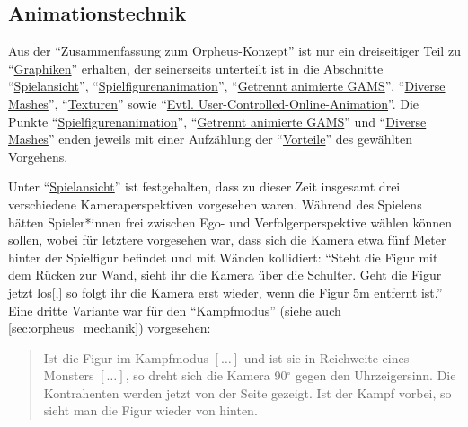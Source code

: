 \documentclass[a5paper,pagesize]{scrbook}
\begin{document}
\subsection{Animationstechnik}\label{sec:orpheus_technik_animationstechnik}
Aus der \enquote{Zusammenfassung zum Orpheus-Konzept} ist nur ein dreiseitiger Teil zu \enquote{\uline{Gra\-phi\-ken}} erhalten, der seinerseits unterteilt ist in die Abschnitte \enquote{\uline{Spiel\-an\-sicht}}, \enquote{\uline{Spiel\-fi\-gu\-ren\-ani\-ma\-ti\-on}}, \enquote{\uline{Ge\-trennt ani\-mier\-te GAMS}}, \enquote{\uline{Di\-ver\-se Mashes}}, \enquote{\uline{Tex\-tu\-ren}} sowie \enquote{\uline{Evtl. User-Con\-trol\-led-On\-line-Ani\-ma\-ti\-on}}.
Die Punkte \enquote{\uline{Spiel\-fi\-gu\-ren\-ani\-ma\-ti\-on}}, \enquote{\uline{Ge\-trennt ani\-mier\-te GAMS}} und \enquote{\uline{Di\-ver\-se Mashes}} enden jeweils mit einer Aufzählung der \enquote{\uline{Vor\-tei\-le}} des gewählten Vorgehens.

Unter \enquote{\uline{Spielansicht}} ist festgehalten, dass zu dieser Zeit insgesamt drei verschiedene Kameraperspektiven vorgesehen waren.
Während des Spielens hätten Spieler*innen frei zwischen Ego- und Verfolgerperspektive wählen können sollen, wobei für letztere vorgesehen war, dass sich die Kamera etwa fünf Meter hinter der Spielfigur befindet und mit Wänden kollidiert:
\enquote{Steht die Figur mit dem Rücken zur Wand, sieht ihr die Kamera über die Schulter. Geht die Figur jetzt los[,] so folgt ihr die Kamera erst wieder, wenn die Figur 5m entfernt ist.}
Eine dritte Variante war für den \enquote{Kampfmodus} (siehe auch \autoref{sec:orpheus_mechanik}) vorgesehen:

\begin{quote}
Ist die Figur im Kampfmodus $[\dots]$ und ist sie in Reichweite eines Monsters $[\dots]$, so dreht sich die Kamera 90$^\circ$ gegen den Uhrzeigersinn. Die Kontrahenten werden jetzt von der Seite gezeigt. Ist der Kampf vorbei, so sieht man die Figur wieder von hinten.\autocite[S.~1]{orpheus_zusammenfassung}
\end{quote}
\end{document}
